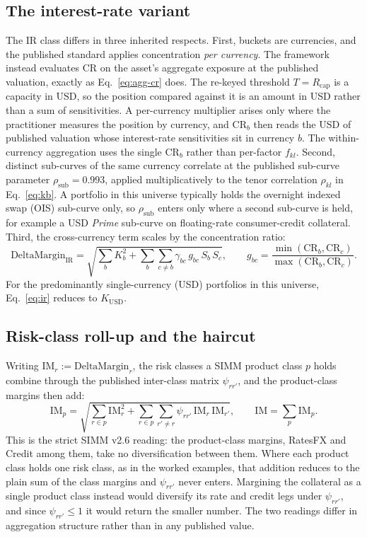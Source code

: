 \subsection{The interest-rate variant}\label{sec:agg-ir}
The IR class differs in three inherited respects.
First, buckets are currencies, and the published standard applies concentration \emph{per
currency}. The framework instead evaluates $\mathrm{CR}$ on the asset's aggregate exposure
at the published valuation, exactly as Eq.~\eqref{eq:agg-cr} does. The re-keyed
threshold $T=R_{\mathrm{cap}}$ is a capacity in USD, so the position compared against it is
an amount in USD rather than a sum of sensitivities. A per-currency multiplier arises only
where the practitioner measures the position by currency, and $\mathrm{CR}_b$ then reads
the USD of published valuation whose interest-rate sensitivities sit in currency $b$. The
within-currency aggregation uses the single $\mathrm{CR}_b$ rather than per-factor
$f_{kl}$. Second, distinct sub-curves
of the same currency correlate at the published sub-curve parameter
$\rho_{\mathrm{sub}}=0.993$, applied multiplicatively to the tenor correlation $\rho_{kl}$ in
Eq.~\eqref{eq:kb}. A portfolio in this universe typically holds the overnight indexed swap (OIS) sub-curve only, so $\rho_{\mathrm{sub}}$ enters only where a second sub-curve is held, for example a USD \emph{Prime} sub-curve on floating-rate consumer-credit collateral.
Third, the cross-currency term scales by the concentration ratio:
\begin{equation}\label{eq:ir}
\mathrm{DeltaMargin}_{\mathrm{IR}}
=\sqrt{\sum_b K_b^2+\sum_b\sum_{c\neq b}\gamma_{bc}\,g_{bc}\,S_b\,S_c},\qquad
g_{bc}=\frac{\min(\mathrm{CR}_b,\mathrm{CR}_c)}{\max(\mathrm{CR}_b,\mathrm{CR}_c)}.
\end{equation}
For the predominantly single-currency (USD) portfolios in this universe,
Eq.~\eqref{eq:ir} reduces to $K_{\mathrm{USD}}$.

\subsection{Risk-class roll-up and the haircut}\label{sec:agg-haircut}
Writing $\mathrm{IM}_r:=\mathrm{DeltaMargin}_r$, the risk classes a SIMM product class $p$
holds combine through the published inter-class matrix $\psi_{rr'}$, and the product-class
margins then add:
\begin{equation}\label{eq:psi}
\mathrm{IM}_p=\sqrt{\sum_{r\in p} \mathrm{IM}_r^2+\sum_{r\in p}\sum_{r'\neq r}\psi_{rr'}\,
\mathrm{IM}_r\,\mathrm{IM}_{r'}},\qquad
\mathrm{IM}=\sum_p \mathrm{IM}_p .
\end{equation}
This is the strict SIMM v2.6 reading: the product-class margins, RatesFX and Credit among
them, take no diversification between them. Where each product class holds one risk class, as in the worked examples, that addition reduces to the plain sum of the class margins
and $\psi_{rr'}$ never enters. Margining the collateral as a single product class instead
would diversify its rate and credit legs under $\psi_{rr'}$, and since $\psi_{rr'}\le 1$ it
would return the smaller number. The two readings differ in aggregation structure rather
than in any published value.

